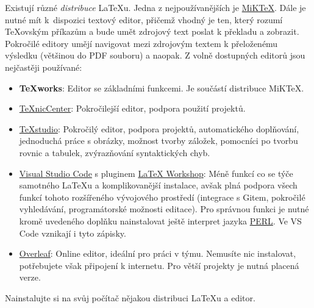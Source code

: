 \documentclass[a4paper,11pt,twoside]{article}
\theoremstyle{red}
\theoremstyle{green}
\begin{document}
    Existují různé \emph{distribuce} \LaTeX{}u.
    Jedna z nejpoužívanějších je \href{https://miktex.org/}{MiKTeX}.
    Dále je nutné mít k~dispozici textový editor, přičemž vhodný je ten, který rozumí \TeX{}ovským příkazům a bude umět zdrojový text poslat k překladu a zobrazit.
    Pokročilé editory umějí navigovat mezi zdrojovým textem k přeloženému výsledku (většinou do PDF souboru) a naopak.
    Z volně dostupných editorů jsou nejčastěji používané:
    \begin{itemize}
        \item {\bf TeXworks}: 
            Editor se základními funkcemi. Je součástí distribuce MiKTeX.
        \item \href{https://www.texniccenter.org/}{TeXnicCenter}: 
            Pokročilejší editor, podpora použití projektů.
        \item \href{https://www.texstudio.org/}{TeXstudio}: 
            Pokročilý editor, podpora projektů, automatického doplňování, jednoduchá práce s obrázky, možnost tvorby záložek, pomocníci po tvorbu rovnic a tabulek, zvýrazňování syntaktických chyb.
        \item \href{https://code.visualstudio.com/}{Visual Studio Code} s pluginem \href{https://marketplace.visualstudio.com/items?itemName=James-Yu.latex-workshop}{LaTeX Workshop}: 
            Méně funkcí co se týče samotného \LaTeX{}u a komplikovanější instalace, avšak plná podpora všech funkcí tohoto rozšířeného vývojového prostředí (integrace s Gitem, pokročilé vyhledávání, programátorské možnosti editace).
            Pro správnou funkci je nutné kromě uvedeného doplňku nainstalovat ještě interpret jazyka \href{https://www.perl.org/}{PERL}.
            Ve VS Code vznikají i tyto zápisky.
        \item \href{https://www.overleaf.com/}{Overleaf}: Online editor, ideální pro práci v týmu. 
            Nemusíte nic instalovat, potřebujete však připojení k internetu. 
            Pro větší projekty je nutná placená verze.
    \end{itemize}

    \begin{task}
        Nainstalujte si na svůj počítač nějakou distribuci \LaTeX{}u a editor.
    \end{task}
\end{document}
